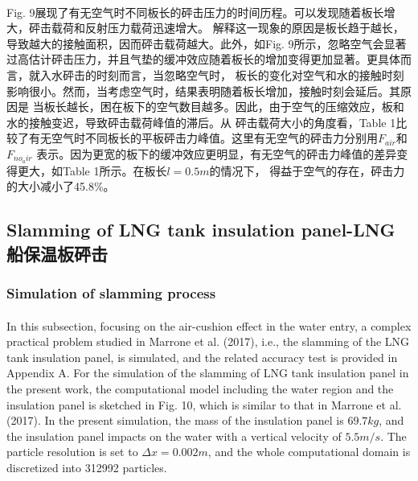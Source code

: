 \documentclass[UTF8]{ctexart}
\begin{document}
\paragraph{\quad}Fig. 9展现了有无空气时不同板长的砰击压力的时间历程。可以发现随着板长增大，砰击载荷和反射压力载荷迅速增大。
                解释这一现象的原因是板长趋于越长，导致越大的接触面积，因而砰击载荷越大。此外，如Fig. 9所示，忽略空气会显著
                过高估计砰击压力，并且气垫的缓冲效应随着板长的增加变得更加显著。更具体而言，就入水砰击的时刻而言，当忽略空气时，
                板长的变化对空气和水的接触时刻影响很小。然而，当考虑空气时，结果表明随着板长增加，接触时刻会延后。其原因是
                当板长越长，困在板下的空气数目越多。因此，由于空气的压缩效应，板和水的接触变迟，导致砰击载荷峰值的滞后。从
                砰击载荷大小的角度看，Table 1比较了有无空气时不同板长的平板砰击力峰值。这里有无空气的砰击力分别用$F_{air}$和$F_{no_air}$
                表示。因为更宽的板下的缓冲效应更明显，有无空气的砰击力峰值的差异变得更大，如Table 1所示。在板长$l = 0.5m$的情况下，
                得益于空气的存在，砰击力的大小减小了45.8\%。

\subsection{Slamming of LNG tank insulation panel-LNG船保温板砰击}
\subsubsection{Simulation of slamming process}
\paragraph{\quad}In this subsection, focusing on the air-cushion effect in the water entry, 
                a complex practical problem studied in Marrone et al. (2017), i.e., the slamming 
                of the LNG tank insulation panel, is simulated, and the related accuracy test is 
                provided in Appendix A. For the simulation of the slamming of LNG tank insulation 
                panel in the present work, the computational model including the water region and 
                the insulation panel is sketched in Fig. 10, which is similar to that in Marrone 
                et al. (2017). In the present simulation, the mass of the insulation panel is $69.7 kg$, 
                and the insulation panel impacts on the water with a vertical velocity of $5.5 m/s$. 
                The particle resolution is set to $\Delta x = 0.002m$, and the whole computational domain 
                is discretized into 312992 particles.
\end{document}
